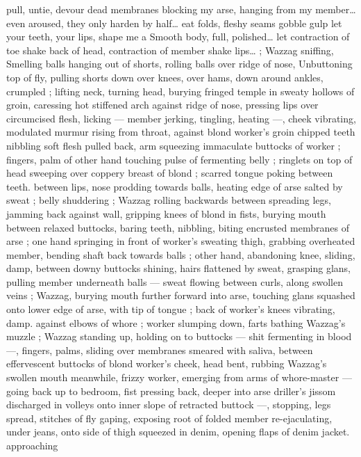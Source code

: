 {pull, untie, devour dead membranes blocking my arse, hanging from 
my member{\ldots} even aroused, they only harden by half{\ldots} eat folds, 
fleshy seams{\td} gobble{\td} gulp{\td} let your teeth, your lips, shape me a 
Smooth body, full, polished{\ldots} let contraction of toe shake back of 
head, contraction of member shake lips{\ldots}{\gr} ; Wazzag sniffing, 
Smelling balls hanging out of shorts, rolling balls over ridge of nose, 
Unbuttoning top of fly, pulling shorts down over knees, over hams, 
down around ankles, crumpled ; lifting neck, turning head, burying 
fringed temple in sweaty hollows of groin, caressing hot stiffened 
arch against ridge of nose, pressing lips over circumcised flesh, 
licking --- member jerking, tingling, heating ---, cheek vibrating, 
modulated murmur rising from throat, against blond worker's groin 
chipped teeth nibbling soft flesh pulled back, arm squeezing 
immaculate buttocks of worker ; fingers, palm of other hand touching 
pulse of fermenting belly ; ringlets on top of head sweeping over 
coppery breast of blond ; scarred tongue poking between teeth. 
between lips, nose prodding towards balls, heating edge of arse 
salted by sweat ; belly shuddering ; Wazzag rolling backwards 
between spreading legs, jamming back against wall, gripping knees 
of blond in fists, burying mouth between relaxed buttocks, baring 
teeth, nibbling, biting encrusted membranes of arse ; one hand 
springing in front of worker's sweating thigh, grabbing overheated 
member, bending shaft back towards balls ; other hand, abandoning 
knee, sliding, damp, between downy buttocks shining, hairs flattened 
by sweat, grasping glans, pulling member underneath balls --- sweat 
flowing between curls, along swollen veins ; Wazzag, burying mouth 
further forward into arse, touching glans squashed onto lower edge 
of arse, with tip of tongue ; back of worker's knees vibrating, damp. 
against elbows of whore ; worker slumping down, farts bathing 
Wazzag's muzzle ; Wazzag standing up, holding on to buttocks --- 
shit fermenting in blood ---, fingers, palms, sliding over membranes 
smeared with saliva, between effervescent buttocks of blond 
worker's cheek, head bent, rubbing Wazzag's swollen mouth 
meanwhile, frizzy worker, emerging from arms of whore-master --- 
going back up to bedroom, fist pressing back, deeper into arse 
driller's jissom discharged in volleys onto inner slope of retracted 
buttock ---, stopping, legs spread, stitches of fly gaping, exposing 
root of folded member re-ejaculating, under jeans, onto side of thigh 
squeezed in denim, opening flaps of denim jacket. approaching 
}
